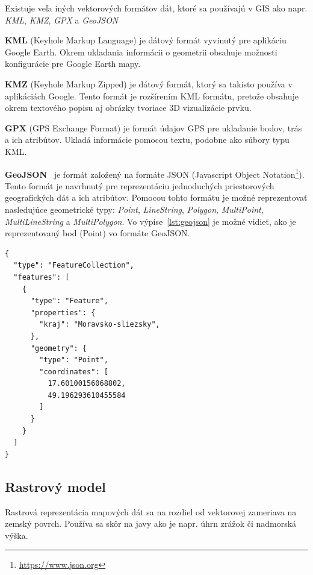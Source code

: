 Existuje veľa iných vektorových formátov dát, ktoré sa používajú v GIS ako napr. \emph{KML}, \emph{KMZ}, \emph{GPX} a \emph{GeoJSON}

\textbf{KML} (Keyhole Markup Language) je dátový formát vyvinutý pre aplikáciu Google Earth. Okrem ukladania informácii o geometrii obsahuje možnosti konfigurácie pre Google Earth mapy.

\textbf{KMZ} (Keyhole Markup Zipped) je dátový formát, ktorý sa takisto používa v aplikáciách Google. Tento formát je rozšírením KML formátu, pretože obsahuje okrem textového popisu aj obrázky tvoriace 3D vizualizácie prvku.

\textbf{GPX} (GPS Exchange Format) je formát údajov GPS pre ukladanie bodov, trás a ich atribútov. Ukladá informácie pomocou textu, podobne ako súbory typu KML.

\textbf{GeoJSON}~\cite{rfc7946} je formát založený na formáte JSON (Javascript Object Notation\footnote{\url{https://www.json.org}}). Tento formát je navrhnutý pre reprezentáciu jednoduchých priestorových geografických dát a ich atribútov. Pomocou tohto formátu je možné reprezentovať nasledujúce geometrické typy: \emph{Point}, \emph{LineString}, \emph{Polygon}, \emph{MultiPoint}, \emph{MultiLineString} a \emph{MultiPolygon}. Vo výpise~\ref{lst:geojson} je možné vidieť, ako je reprezentovaný bod (Point) vo formáte GeoJSON.

\begin{lstlisting}
{
  "type": "FeatureCollection",
  "features": [
    {
      "type": "Feature",
      "properties": {
        "kraj": "Moravsko-sliezsky",
      },
      "geometry": {
        "type": "Point",
        "coordinates": [
          17.60100156068802,
          49.196293610455584
        ]
      }
    }
  ]
}
\end{lstlisting}

\subsection{Rastrový model}
Rastrová reprezentácia mapových dát sa na rozdiel od vektorovej zameriava na zemský povrch. Používa sa skôr na javy ako je napr. úhrn zrážok či nadmorská výška.

